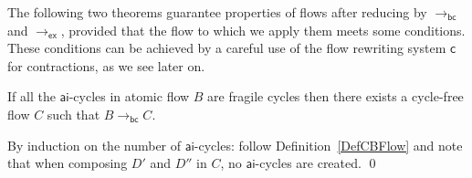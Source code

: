 \documentclass[a4paper]{LMCS}
\begin{document}
The following two theorems guarantee properties of flows after reducing by $\to_{{\mathsf{bc}}}$ and $\to_{{\mathsf{ex}}}$, provided that the flow to which we apply them meets some conditions. These conditions can be achieved by a careful use of the flow rewriting system ${{\mathsf c}}$ for contractions, as we see later on.

\begin{thm}\label{ThALSE}
If all the\/ ${\mathsf{ai}}$-cycles in atomic flow $B$ are fragile cycles then there exists a cycle-free flow $C$ such that $B\to_{{\mathsf{bc}}} C$.
\end{thm}

\proof
By induction on the number of ${\mathsf{ai}}$-cycles: follow Definition~\ref{DefCBFlow} and note that when composing $D'$ and $D''$ in $C$, no ${\mathsf{ai}}$-cycles are created.
\qed
\end{document}
